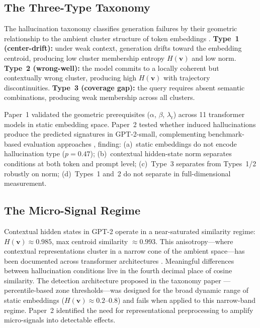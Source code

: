 \documentclass[11pt]{article}
\newcommand{\Ls}{\lambda_{\mathrm{r}}}
\newcommand{\Hv}{H(\mathbf{v})}
\begin{document}
\subsection{The Three-Type Taxonomy}

The hallucination taxonomy classifies generation failures by their geometric relationship to the ambient cluster structure of token embeddings \citep{ji2023survey, huang2023survey, su2023characterizing}. \textbf{Type~1 (center-drift):} under weak context, generation drifts toward the embedding centroid, producing low cluster membership entropy $\Hv$ \citep{shannon1948mathematical} and low norm. \textbf{Type~2 (wrong-well):} the model commits to a locally coherent but contextually wrong cluster, producing high $\Hv$ with trajectory discontinuities. \textbf{Type~3 (coverage gap):} the query requires absent semantic combinations, producing weak membership across all clusters.

Paper~1 \citep{author2026geometry} validated the geometric prerequisites ($\alpha$, $\beta$, $\Ls$) across 11 transformer models in static embedding space. Paper~2 \citep{author2026induction} tested whether induced hallucinations produce the predicted signatures in GPT-2-small, complementing benchmark-based evaluation approaches \citep{li2023halueval}, finding: (a)~static embeddings do not encode hallucination type ($p = 0.47$); (b)~contextual hidden-state norm separates conditions at both token and prompt level; (c)~Type~3 separates from Types~1/2 robustly on norm; (d)~Types~1 and~2 do not separate in full-dimensional measurement.

\subsection{The Micro-Signal Regime}

Contextual hidden states in GPT-2 operate in a near-saturated similarity regime: $\Hv \approx 0.985$, max centroid similarity $\approx 0.993$. This anisotropy---where contextual representations cluster in a narrow cone of the ambient space---has been documented across transformer architectures \citep{ethayarajh2019contextual, cai2021isotropy, bis2021too, rajaee2021isotropy}. Meaningful differences between hallucination conditions live in the fourth decimal place of cosine similarity. The detection architecture proposed in the taxonomy paper \citep{author2026geometry}---percentile-based zone thresholds---was designed for the broad dynamic range of static embeddings ($\Hv \approx 0.2$--$0.8$) and fails when applied to this narrow-band regime. Paper~2 identified the need for representational preprocessing to amplify micro-signals into detectable effects.
\end{document}
